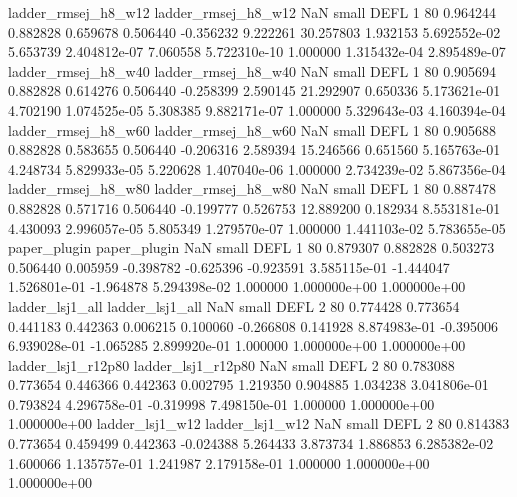      ladder_rmsej_h8_w12      ladder_rmsej_h8_w12                   NaN      small     DEFL                 1 80 0.964244       0.882828 0.659678       0.506440   -0.356232      9.222261     30.257803     1.932153   5.692552e-02  5.653739 2.404812e-07     7.060558   5.722310e-10            1.000000    1.315432e-04        2.895489e-07
     ladder_rmsej_h8_w40      ladder_rmsej_h8_w40                   NaN      small     DEFL                 1 80 0.905694       0.882828 0.614276       0.506440   -0.258399      2.590145     21.292907     0.650336   5.173621e-01  4.702190 1.074525e-05     5.308385   9.882171e-07            1.000000    5.329643e-03        4.160394e-04
     ladder_rmsej_h8_w60      ladder_rmsej_h8_w60                   NaN      small     DEFL                 1 80 0.905688       0.882828 0.583655       0.506440   -0.206316      2.589394     15.246566     0.651560   5.165763e-01  4.248734 5.829933e-05     5.220628   1.407040e-06            1.000000    2.734239e-02        5.867356e-04
     ladder_rmsej_h8_w80      ladder_rmsej_h8_w80                   NaN      small     DEFL                 1 80 0.887478       0.882828 0.571716       0.506440   -0.199777      0.526753     12.889200     0.182934   8.553181e-01  4.430093 2.996057e-05     5.805349   1.279570e-07            1.000000    1.441103e-02        5.783655e-05
            paper_plugin             paper_plugin                   NaN      small     DEFL                 1 80 0.879307       0.882828 0.503273       0.506440    0.005959     -0.398782     -0.625396    -0.923591   3.585115e-01 -1.444047 1.526801e-01    -1.964878   5.294398e-02            1.000000    1.000000e+00        1.000000e+00
         ladder_lsj1_all          ladder_lsj1_all                   NaN      small     DEFL                 2 80 0.774428       0.773654 0.441183       0.442363    0.006215      0.100060     -0.266808     0.141928   8.874983e-01 -0.395006 6.939028e-01    -1.065285   2.899920e-01            1.000000    1.000000e+00        1.000000e+00
      ladder_lsj1_r12p80       ladder_lsj1_r12p80                   NaN      small     DEFL                 2 80 0.783088       0.773654 0.446366       0.442363    0.002795      1.219350      0.904885     1.034238   3.041806e-01  0.793824 4.296758e-01    -0.319998   7.498150e-01            1.000000    1.000000e+00        1.000000e+00
         ladder_lsj1_w12          ladder_lsj1_w12                   NaN      small     DEFL                 2 80 0.814383       0.773654 0.459499       0.442363   -0.024388      5.264433      3.873734     1.886853   6.285382e-02  1.600066 1.135757e-01     1.241987   2.179158e-01            1.000000    1.000000e+00        1.000000e+00
